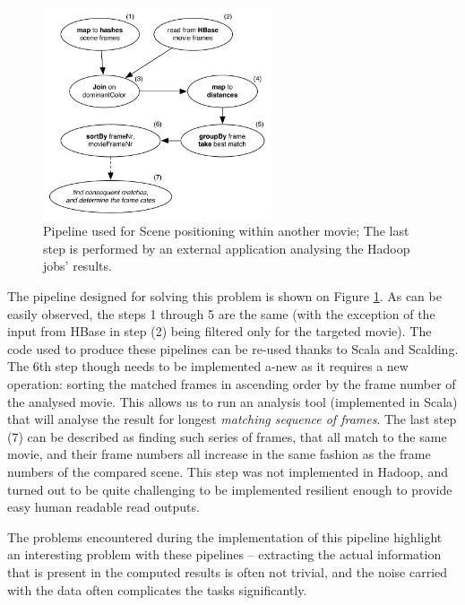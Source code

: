 \begin{figure}[ch!]
  \centering
  \includegraphics[width=0.6\textwidth]{img/top-match-job-positioning}
  \caption{Pipeline used for Scene positioning within another movie; The last step is performed by an external application analysing the Hadoop jobs' results.}
  \label{fig:job-scene}
\end{figure}


The pipeline designed for solving this problem is shown on Figure \ref{fig:job-scene}. As can be easily observed, the steps 1 through 5 are the same (with the exception of the input from HBase in step (2) being filtered only for the targeted movie). The code used to produce these pipelines can be re-used thanks to Scala and Scalding. The 6th step though needs to be implemented a-new as it requires a new operation: sorting the matched frames in ascending order by the frame number of the analysed movie. This allows us to run an analysis tool (implemented in Scala) that will analyse the result for longest \textit{matching sequence of frames}. The last step (7) can be described as finding such series of frames, that all match to the same movie, and their frame numbers all increase in the same fashion as the frame numbers of the compared scene. This step was not implemented in Hadoop, and turned out to be quite challenging to be implemented resilient enough to provide easy human readable read outputs. 

The problems encountered during the implementation of this pipeline highlight an interesting problem with these pipelines -- extracting the actual information that is present in the computed results is often not trivial, and the noise carried with the data often complicates the tasks significantly.






